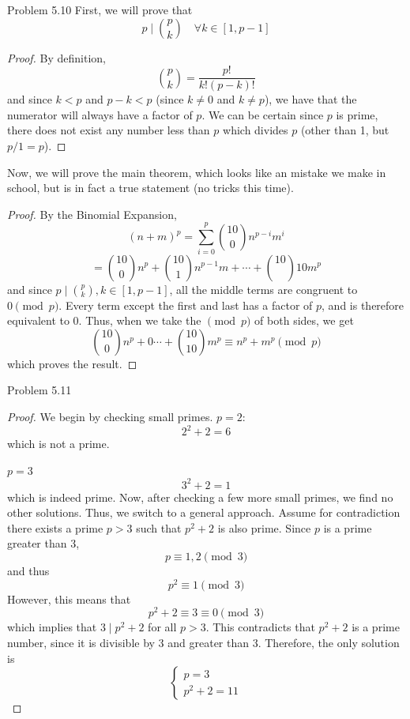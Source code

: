 \begin{sol}{Problem 5.10}
First, we will prove that 
\[
p \mid {\binom{p}{k}} \quad \forall k \in [1, p-1]
\]
\begin{proof}
By definition, 
\[
{\binom{p}{k}} = \frac{p!}{k!(p-k)!}
\]
and since $k < p$ and $p-k < p$ (since $k \neq 0$ and $k \neq p$), we have that the numerator will always have a factor of $p$. We can be certain since $p$ is prime, there does not exist any number less than $p$ which divides $p$ (other than 1, but $p/1 = p$). 
\end{proof}
Now, we will prove the main theorem, which looks like an mistake we make in school, but is in fact a true statement (no tricks this time).
\begin{proof}
By the Binomial Expansion, 
\[
(n+m)^p = \sum_{i=0}^{p}{{\binom{10}{0}}n^{p-i}m^{i}}
\]
\[
= {\binom{10}{0}}n^p + {\binom{10}{1}}n^{p-1}m + \cdots + {\binom{10}{}10}m^p
\]
and since $p \mid {\binom{p}{k}},  k \in [1, p-1]$, all the middle terms are congruent to $0 \pmod{p}$. Every term except the first and last has a factor of $p$, and is therefore equivalent to 0. Thus, when we take the $\pmod{p}$ of both sides, we get
\[
{\binom{10}{0}}n^p + 0 \cdots + {\binom{10}{10}}m^p \equiv n^p + m^p \pmod{p}
\]
which proves the result.
\end{proof}
\end{sol}

\begin{sol}{Problem 5.11}
\begin{proof}
We begin by checking small primes.
$p = 2$:
\[
2^2 + 2 = 6
\]
which is not a prime.

$p = 3$
\[
3^2 + 2 = 1
\]
which is indeed prime. Now, after checking a few more small primes, we find no other solutions. Thus, we switch to a general approach. Assume for contradiction there exists a prime $p > 3$ such that $p^2 + 2$ is also prime. Since $p$ is a prime greater than 3, 
\[
p \equiv 1, 2 \pmod{3}
\]
and thus 
\[
p^2 \equiv 1 \pmod{3}
\]
However, this means that 
\[
p^2 + 2 \equiv 3 \equiv 0 \pmod{3}
\]
which implies that $3 \mid p^2 + 2$ for all $p > 3$. This contradicts that $p^2 + 2$ is a prime number, since it is divisible by 3 and greater than 3. Therefore, the only solution is 
\[
\boxed{\begin{cases}p=3 \\p^2 + 2 = 11\end{cases}}
\]
\end{proof}
\end{sol}

